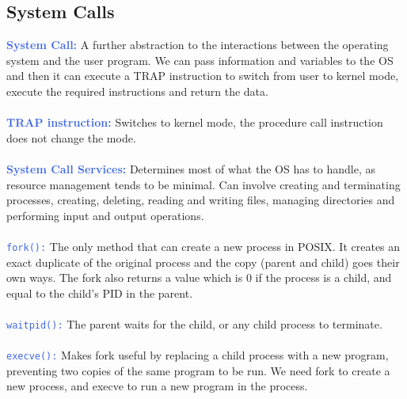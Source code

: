 \documentclass[a4paper,10pt]{article}
\begin{document}
\subsection{System Calls}
\textcolor{RoyalBlue}{\textbf{System Call:}} A further abstraction to the interactions between the operating system and the user program. We can pass information and variables to the OS and then it can execute a TRAP instruction to switch from user to kernel mode, execute the required instructions and return the data. \\\\
\textcolor{RoyalBlue}{\textbf{TRAP instruction:}} Switches to kernel mode, the procedure call instruction does not change the mode. \\\\
\textcolor{RoyalBlue}{\textbf{System Call Services:}} Determines most of what the OS has to handle, as resource management tends to be minimal. Can involve creating and terminating processes, creating, deleting, reading and writing files, managing directories and performing input and output operations. \\\\
\textcolor{RoyalBlue}{\texttt{fork():}} The only method that can create a new process in POSIX. It creates an exact duplicate of the original process and the copy (parent and child) goes their own ways. The fork also returns a value which is 0 if the process is a child, and equal to the child's PID in the parent. \\\\
\textcolor{RoyalBlue}{\texttt{waitpid():}} The parent waits for the child, or any child process to terminate. \\\\
\textcolor{RoyalBlue}{\texttt{execve():}} Makes fork useful by replacing a child process with a new program, preventing two copies of the same program to be run. We need fork to create a new process, and execve to run a new program in the process.
\end{document}
